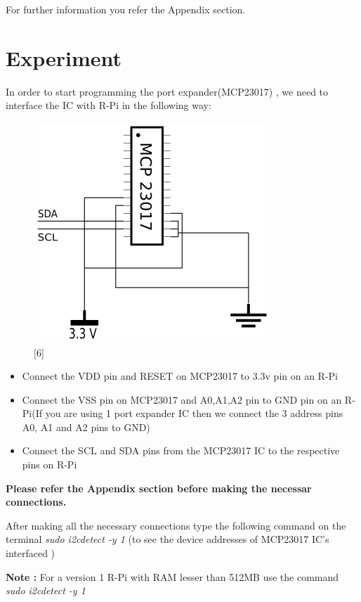 \documentclass[11pt,a4paper]{article}
\begin{document}
	\flushleft
	For further information you refer the Appendix section.
	
	\newpage
	\section{Experiment}
	In order to start programming the port expander(MCP23017) , we need to interface the IC with R-Pi in the following way:
	\begin{figure}[h!]
		\includegraphics[scale=0.8]{interface.png}
		\centering
		\caption{[6]}
	\end{figure} 
	\flushleft
	
	\begin{itemize}
		\item Connect the VDD pin and RESET on MCP23017 to 3.3v pin on an R-Pi 
		\item Connect the VSS pin on MCP23017 and A0,A1,A2 pin to GND pin on an R-Pi(If you are using 1 port expander IC then we connect the 3 address pins A0, A1 and A2 pins to GND)
        \item Connect the SCL and SDA pins from the MCP23017 IC to the respective pins on R-Pi
	\end{itemize}
	
	\vspace{0.3cm}
	\textbf{Please refer the Appendix section before making the necessar connections. }
	
	\vspace{0.3cm}
	After making all the necessary connections type the following command on the terminal \textit{sudo i2cdetect -y 1} (to see the device addresses of MCP23017 IC's interfaced )
		
	\vspace{0.3cm}
	\textbf{Note :} For a version 1 R-Pi with RAM lesser than 512MB use the command \textit{sudo i2cdetect -y 1} 
	
\end{document}
